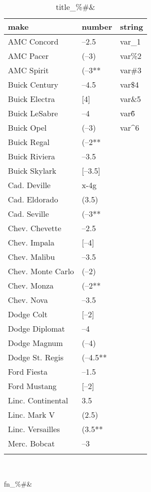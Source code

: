 \documentclass{article}
\begin{document}
\begin{table}[tbp] \centering
{}

\caption{title\_\%\#\&}
\begin{tabularx}{\linewidth}{@{}lCC@{}}

\toprule
{make}&{number}&{string} \tabularnewline
\midrule \addlinespace[\belowrulesep]
AMC Concord&--2.5&var\_1 \tabularnewline
AMC Pacer&(--3)&var\%2 \tabularnewline
AMC Spirit&(--3**&var\#3 \tabularnewline
Buick Century&--4.5&var\$4 \tabularnewline
Buick Electra&[4]&var\&5 \tabularnewline
Buick LeSabre&--4&var\~6 \tabularnewline
Buick Opel&(--3)&var\^{}6 \tabularnewline
Buick Regal&(--2**& \tabularnewline
Buick Riviera&--3.5& \tabularnewline
Buick Skylark&[--3.5]& \tabularnewline
Cad. Deville&x-4g& \tabularnewline
Cad. Eldorado&(3.5)& \tabularnewline
Cad. Seville&(--3**& \tabularnewline
Chev. Chevette&--2.5& \tabularnewline
Chev. Impala&[--4]& \tabularnewline
Chev. Malibu&--3.5& \tabularnewline
Chev. Monte Carlo&(--2)& \tabularnewline
Chev. Monza&(--2**& \tabularnewline
Chev. Nova&--3.5& \tabularnewline
Dodge Colt&[--2]& \tabularnewline
Dodge Diplomat&--4& \tabularnewline
Dodge Magnum&(--4)& \tabularnewline
Dodge St. Regis&(--4.5**& \tabularnewline
Ford Fiesta&--1.5& \tabularnewline
Ford Mustang&[--2]& \tabularnewline
Linc. Continental&3.5& \tabularnewline
Linc. Mark V&(2.5)& \tabularnewline
Linc. Versailles&(3.5**& \tabularnewline
Merc. Bobcat&--3& \tabularnewline
\bottomrule \addlinespace[\belowrulesep]

\end{tabularx}
\\ \parbox{\linewidth}{\footnotesize fn\_\%\#\&}
\end{table}
\end{document}
